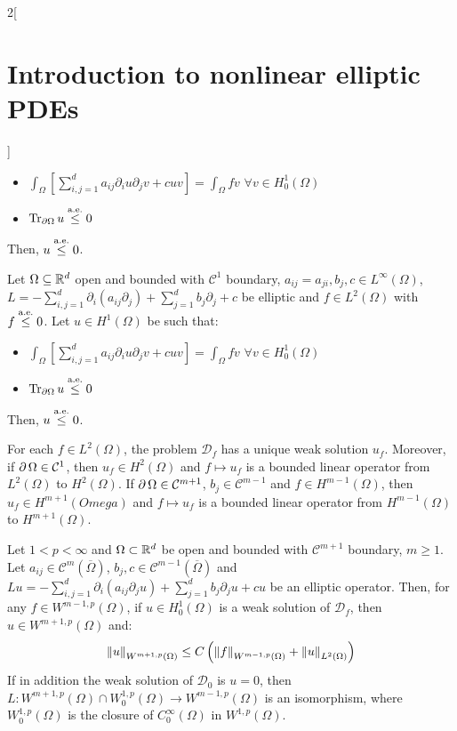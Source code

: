 \documentclass[../../../main_math.tex]{subfiles}
\begin{document}
\begin{multicols}{2}[\section{Introduction to nonlinear elliptic PDEs}]
\begin{theorem}
    \begin{itemize}
      \item $\displaystyle \int_\Omega\left[\sum_{i,j=1}^da_{ij}\partial_iu\partial_jv+cuv\right]=\int_\Omega fv$ $\forall v\in H^1_0(\Omega)$
      \item $\Tr_{\partial\Omega}u\overset{\text{a.e.}}{\leq}0$
    \end{itemize}
    Then, $u\overset{\text{a.e.}}{\leq}0$.
  \end{theorem}
  \begin{theorem}
    Let $\Omega\subseteq\mathbb{R}^d$ open and bounded with $\mathcal{C}^1$ boundary, $a_{ij}=a_{ji},b_j,c\in L^\infty(\Omega)$, $L=-\sum_{i,j=1}^d\partial_i(a_{ij}\partial_j)+\sum_{j=1}^db_j\partial_j+c$ be elliptic and $f\in L^2(\Omega)$ with $f\overset{\text{a.e.}}{\leq} 0$. Let $u\in H^1(\Omega)$ be such that:
    \begin{itemize}
      \item $\displaystyle \int_\Omega\left[\sum_{i,j=1}^da_{ij}\partial_iu\partial_jv+cuv\right]=\int_\Omega fv$ $\forall v\in H^1_0(\Omega)$
      \item $\Tr_{\partial\Omega}u\overset{\text{a.e.}}{\leq}0$
    \end{itemize}
    Then, $u\overset{\text{a.e.}}{\leq}0$.
  \end{theorem}
  \begin{corollary}
    For each $f\in L^2(\Omega)$, the problem $\mathcal{D}_f$ has a unique weak solution $u_f$. Moreover, if $\operatorname{\partial}{\Omega}\in\mathcal{C}^1$, then $u_f\in H^2(\Omega)$ and $f\mapsto u_f$ is a bounded linear operator from $L^2(\Omega)$ to $H^2(\Omega)$. If $\operatorname{\partial}{\Omega}\in\mathcal{C}^{m+1}$, $b_j\in\mathcal{C}^{m-1}$ and $f\in H^{m-1}(\Omega)$, then $u_f\in H^{m+1}(Omega)$ and $f\mapsto u_f$ is a bounded linear operator from $H^{m-1}(\Omega)$ to $H^{m+1}(\Omega)$.
  \end{corollary}
  \begin{theorem}
    Let $1<p<\infty$ and $\Omega\subset\mathbb{R}^d$ be open and bounded with $\mathcal{C}^{m+1}$ boundary, $m\geq 1$. Let $a_{ij}\in \mathcal{C}^m(\overline{\Omega})$, $b_j,c\in \mathcal{C}^{m-1}(\overline{\Omega})$ and $Lu=-\sum_{i,j=1}^d \partial_i(a_{ij}\partial_j u)+\sum_{j=1}^d b_j\partial_j u+cu$ be an elliptic operator. Then, for any $f\in W^{m-1,p}(\Omega)$, if $u\in H^1_0(\Omega)$ is a weak solution of $\mathcal{D}_f$, then $u\in W^{m+1,p}(\Omega)$ and:
    $$
      \left\|u\right\|_{W^{m+1,p}(\Omega)}\leq C\left(\left\|f\right\|_{W^{m-1,p}(\Omega)}+\left\|u\right\|_{L^2(\Omega)}\right)
    $$
    If in addition the weak solution of $\mathcal{D}_0$ is $u=0$, then $L:W^{m+1,p}(\Omega)\cap W_0^{1,p}(\Omega)\to W^{m-1,p}(\Omega)$ is an isomorphism, where $W_0^{1,p}(\Omega)$ is the closure of $C_0^\infty(\Omega)$ in $W^{1,p}(\Omega)$.
  \end{theorem}

\end{multicols}
\end{document}
